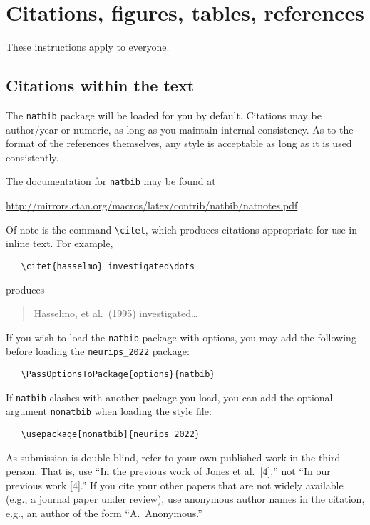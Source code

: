 \documentclass{article}
\begin{document}
\section{Citations, figures, tables, references}
\label{others}


These instructions apply to everyone.


\subsection{Citations within the text}


The \verb+natbib+ package will be loaded for you by default.  Citations may be
author/year or numeric, as long as you maintain internal consistency.  As to the
format of the references themselves, any style is acceptable as long as it is
used consistently.


The documentation for \verb+natbib+ may be found at
\begin{center}
  \url{http://mirrors.ctan.org/macros/latex/contrib/natbib/natnotes.pdf}
\end{center}
Of note is the command \verb+\citet+, which produces citations appropriate for
use in inline text.  For example,
\begin{verbatim}
   \citet{hasselmo} investigated\dots
\end{verbatim}
produces
\begin{quote}
  Hasselmo, et al.\ (1995) investigated\dots
\end{quote}


If you wish to load the \verb+natbib+ package with options, you may add the
following before loading the \verb+neurips_2022+ package:
\begin{verbatim}
   \PassOptionsToPackage{options}{natbib}
\end{verbatim}


If \verb+natbib+ clashes with another package you load, you can add the optional
argument \verb+nonatbib+ when loading the style file:
\begin{verbatim}
   \usepackage[nonatbib]{neurips_2022}
\end{verbatim}


As submission is double blind, refer to your own published work in the third
person. That is, use ``In the previous work of Jones et al.\ [4],'' not ``In our
previous work [4].'' If you cite your other papers that are not widely available
(e.g., a journal paper under review), use anonymous author names in the
citation, e.g., an author of the form ``A.\ Anonymous.''
\end{document}
